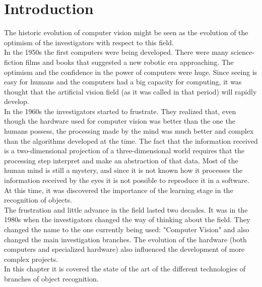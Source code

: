 \chapter*{Introduction}

The historic evolution of computer vision might be seen as the evolution of the optimism of the investigators with respect to this field. 
\\

In the 1950s the first computers were being developed. There were many science-fiction films and books that suggested a new robotic era approaching. The optimism and the confidence in the power of computers were huge. 
Since seeing is easy for humans and the computers had a big capacity for computing, it was thought that the artificial vision field (as it was called in that period) will rapidly develop. 
\\

In the 1960s the investigators started to frustrate. They realized that, even though the hardware used for computer vision was better than the one the humans possess, the processing made by the mind was much better and complex than the algorithms developed at the time. 
The fact that the information received is a two-dimensional projection of a three-dimensional world requires that the processing step interpret and make an abstraction of that data. Most of the human mind is still a mystery, and since it is not known how it processes the information received by the eyes it is not possible to reproduce it in a software. 
At this time, it was discovered the importance of the learning stage in the recognition of objects. 
\\

The frustration and little advance in the field lasted two decades. It was in the 1980s when the investigators changed the way of thinking about the field. They changed the name to the one currently being used: "Computer Vision" and also changed the main investigation branches.
The evolution of the hardware (both computers and specialized hardware) also influenced the development of more complex projects. 
\\

In this chapter it is covered the state of the art of the different technologies of branches of object recognition. 
